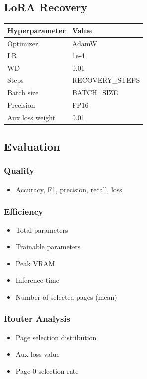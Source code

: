 \subsection{LoRA Recovery}

\begin{table}[H]
\centering
\small
\begin{tabular}{ll}
\toprule
\textbf{Hyperparameter} & \textbf{Value} \\
\midrule
Optimizer & AdamW \\
LR & 1e-4 \\
WD & 0.01 \\
Steps & {{RECOVERY\_STEPS}} \\
Batch size & {{BATCH\_SIZE}} \\
Precision & FP16 \\
Aux loss weight & 0.01 \\
\bottomrule
\end{tabular}
\end{table}

\subsection{Evaluation}

\subsubsection{Quality}
\begin{itemize}
\item Accuracy, F1, precision, recall, loss

\end{itemize}
\subsubsection{Efficiency}
\begin{itemize}
\item Total parameters
\item Trainable parameters
\item Peak VRAM
\item Inference time
\item Number of selected pages (mean)

\end{itemize}
\subsubsection{Router Analysis}
\begin{itemize}
\item Page selection distribution
\item Aux loss value
\item Page-0 selection rate

\end{itemize}
